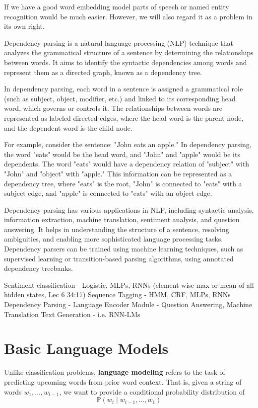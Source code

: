 \documentclass{article}
\begin{document}
  If we have a good word embedding model parts of speech or named entity recognition would be much easier. However, we will also regard it as a problem in its own right. 

  Dependency parsing is a natural language processing (NLP) technique that analyzes the grammatical structure of a sentence by determining the relationships between words. It aims to identify the syntactic dependencies among words and represent them as a directed graph, known as a dependency tree.

  In dependency parsing, each word in a sentence is assigned a grammatical role (such as subject, object, modifier, etc.) and linked to its corresponding head word, which governs or controls it. The relationships between words are represented as labeled directed edges, where the head word is the parent node, and the dependent word is the child node.

  For example, consider the sentence: "John eats an apple." In dependency parsing, the word "eats" would be the head word, and "John" and "apple" would be its dependents. The word "eats" would have a dependency relation of "subject" with "John" and "object" with "apple." This information can be represented as a dependency tree, where "eats" is the root, "John" is connected to "eats" with a subject edge, and "apple" is connected to "eats" with an object edge.

  Dependency parsing has various applications in NLP, including syntactic analysis, information extraction, machine translation, sentiment analysis, and question answering. It helps in understanding the structure of a sentence, resolving ambiguities, and enabling more sophisticated language processing tasks. Dependency parsers can be trained using machine learning techniques, such as supervised learning or transition-based parsing algorithms, using annotated dependency treebanks.

  Sentiment classification - Logistic, MLPs, RNNs (element-wise max or mean of all hidden states, Lec 6 34:17) 
  Sequence Tagging - HMM, CRF, MLPs, RNNs
  Dependency Parsing - 
  Language Encoder Module - Question Answering, Machine Translation 
  Text Generation - i.e. RNN-LMs

\section{Basic Language Models}

  Unlike classification problems, \textbf{language modeling} refers to the task of predicting upcoming words from prior word context. That is, given a string of words $w_1, \ldots, w_{t-1}$, we want to provide a conditional probability distribution of 
  \begin{equation}
    \mathbb{P}(w_t \mid w_{t-1}, \ldots, w_1 )
  \end{equation}
\end{document}
